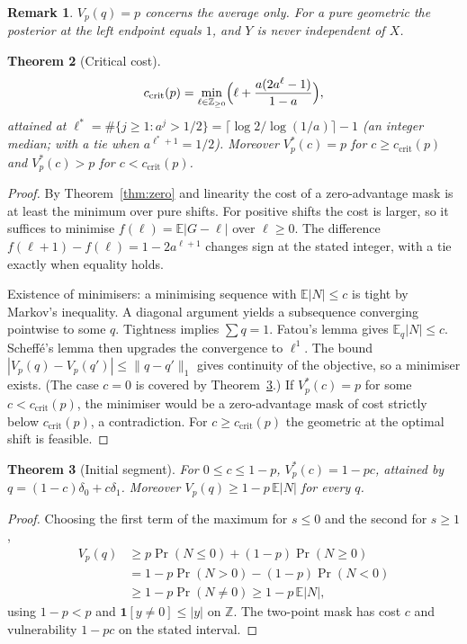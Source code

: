 \documentclass[conference]{IEEEtran}
\newtheorem{theorem}{Theorem}
\newtheorem{remark}[theorem]{Remark}
\newcommand{\Z}{\mathbb{Z}}
\newcommand{\E}{\mathbb{E}}
\begin{document}
\begin{remark}
\(V_p(q)=p\) concerns the average only. For a pure geometric the posterior at the left endpoint equals \(1\), and \(Y\) is never independent of \(X\).
\end{remark}

\begin{theorem}[Critical cost]\label{thm:ccrit}
\[
c_{\mathrm{crit}}(p)=\min_{\ell\in\Z_{\ge0}}\Bigl(\ell+\frac{a(2a^\ell-1)}{1-a}\Bigr),
\]
attained at \(\ell^*=\#\{j\ge1:a^j>1/2\}=\lceil\log2/\log(1/a)\rceil-1\) (an integer median; with a tie when \(a^{\ell^*+1}=1/2\)). Moreover \(V_p^*(c)=p\) for \(c\ge c_{\mathrm{crit}}(p)\) and \(V_p^*(c)>p\) for \(c<c_{\mathrm{crit}}(p)\).
\end{theorem}
\begin{proof}
By Theorem~\ref{thm:zero} and linearity the cost of a zero-advantage mask is at least the minimum over pure shifts. For positive shifts the cost is larger, so it suffices to minimise \(f(\ell)=\E|G-\ell|\) over \(\ell\ge0\). The difference \(f(\ell+1)-f(\ell)=1-2a^{\ell+1}\) changes sign at the stated integer, with a tie exactly when equality holds.

Existence of minimisers: a minimising sequence with \(\E|N|\le c\) is tight by Markov's inequality. A diagonal argument yields a subsequence converging pointwise to some \(q\). Tightness implies \(\sum q=1\). Fatou's lemma gives \(\E_q|N|\le c\). Scheff\'e's lemma then upgrades the convergence to \(\ell^1\). The bound \(|V_p(q)-V_p(q')|\le\|q-q'\|_1\) gives continuity of the objective, so a minimiser exists. (The case \(c=0\) is covered by Theorem~\ref{thm:initial}.) If \(V_p^*(c)=p\) for some \(c<c_{\mathrm{crit}}(p)\), the minimiser would be a zero-advantage mask of cost strictly below \(c_{\mathrm{crit}}(p)\), a contradiction. For \(c\ge c_{\mathrm{crit}}(p)\) the geometric at the optimal shift is feasible.
\end{proof}

\begin{theorem}[Initial segment]\label{thm:initial}
For \(0\le c\le1-p\), \(V_p^*(c)=1-pc\), attained by \(q=(1-c)\delta_0+c\delta_1\). Moreover \(V_p(q)\ge1-p\,\E|N|\) for every \(q\).
\end{theorem}
\begin{proof}
Choosing the first term of the maximum for \(s\le0\) and the second for \(s\ge1\),
\begin{align*}
V_p(q)&\ge p\Pr(N\le0)+(1-p)\Pr(N\ge0)\\
&=1-p\Pr(N>0)-(1-p)\Pr(N<0)\\
&\ge1-p\Pr(N\ne0)\ge1-p\,\E|N|,
\end{align*}
using \(1-p<p\) and \(\mathbf 1[y\ne0]\le|y|\) on \(\Z\). The two-point mask has cost \(c\) and vulnerability \(1-pc\) on the stated interval.
\end{proof}
\end{document}
